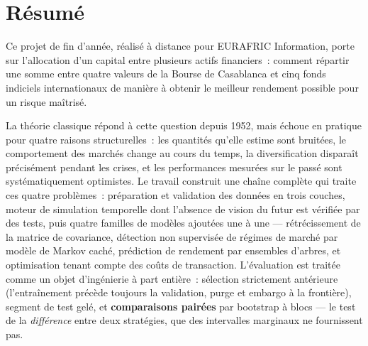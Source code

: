 %

\chapter*{Résumé}
\enlargethispage{3\baselineskip}
\small

Ce projet de fin d'année, réalisé à distance pour EURAFRIC Information, porte sur
l'allocation d'un capital entre plusieurs actifs financiers~: comment répartir
une somme entre quatre valeurs de la Bourse de Casablanca et cinq fonds
indiciels internationaux de manière à obtenir le meilleur rendement possible pour
un risque maîtrisé.

La théorie classique répond à cette question depuis 1952, mais échoue en pratique
pour quatre raisons structurelles~: les quantités qu'elle estime sont bruitées,
le comportement des marchés change au cours du temps, la diversification
disparaît précisément pendant les crises, et les performances mesurées sur le
passé sont systématiquement optimistes. Le travail construit une chaîne complète
qui traite ces quatre problèmes~: préparation et validation des données en trois
couches, moteur de simulation temporelle dont l'absence de vision du futur est
vérifiée par des tests, puis quatre familles de modèles ajoutées une à une —
rétrécissement de la matrice de covariance, détection non supervisée de régimes
de marché par modèle de Markov caché, prédiction de rendement par ensembles
d'arbres, et optimisation tenant compte des coûts de transaction. L'évaluation
est traitée comme un objet d'ingénierie à part entière~: sélection strictement
antérieure (l'entraînement précède toujours la validation, purge et embargo à la
frontière), segment de test gelé, et \textbf{comparaisons pairées} par bootstrap
à blocs — le test de la \emph{différence} entre deux stratégies, que des
intervalles marginaux ne fournissent pas.

